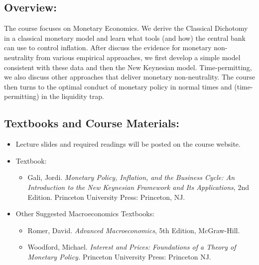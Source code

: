 \documentclass[12pt]{article}
\begin{document}
\subsection*{Overview:}

The course focuses on Monetary Economics. We derive the Classical Dichotomy in a classical monetary model and learn what tools (and how) the central bank can use to control inflation. After discuss the evidence for monetary non-neutrality from various empirical approaches, we first develop a simple model consistent with these data and then the New Keynesian model. Time-permitting, we also discuss other approaches that deliver monetary non-neutrality. The course then turns to the optimal conduct of monetary policy in normal times and (time-permitting) in the liquidity trap.


\subsection*{Textbooks and Course Materials:}

\begin{itemize}
	\item Lecture slides and required readings will be posted on the course website.
	\item Textbook:
	\begin{itemize}
		\item Gali, Jordi. \emph{Monetary Policy, Inflation, and the Business Cycle: An Introduction to the New Keynesian Framework and Its Applications}, 2nd Edition. Princeton University Press: Princeton, NJ.
	\end{itemize}
	\item Other Suggested Macroeconomics Textbooks:
	\begin{itemize}
		\item Romer, David. \emph{Advanced Macroeconomics}, 5th Edition, McGraw-Hill.
		\item Woodford, Michael. \emph{Interest and Prices: Foundations of a Theory of Monetary Policy.} Princeton University Press: Princeton NJ.
	\end{itemize}
\end{itemize}
\end{document}
